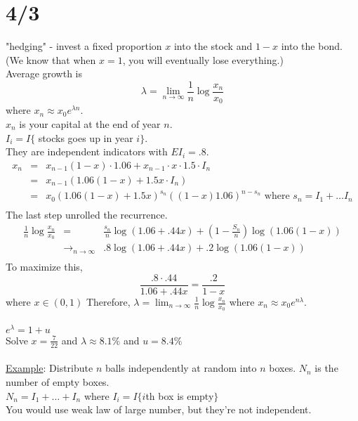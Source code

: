 \section*{4/3}
  "hedging" - invest a fixed proportion $x$ into the stock and
  $1 - x$ into the bond. (We know that when $x = 1$, you will 
  eventually lose everything.)\\
  Average growth is
  $$
    \lambda = \lim_{n \to \infty} \frac{1}{n} \log\frac{x_n}{x_0}
  $$
  where $x_n \approx x_0 e^{\lambda n}$.\\
  $x_n$ is your capital at the end of year $n$.\\
  $I_i = I\{$ stocks goes up in year $i \}$.\\
  They are independent indicators with $EI_i = .8$.\\
  \begin{eqnarray*}
    x_n & = & x_{n-1}(1-x)\cdot 1.06 + x_{n-1} \cdot x \cdot 1.5 \cdot I_n\\
      & = & x_{n-1}(1.06(1 - x) + 1.5x \cdot I_n)\\
      & = & x_0(1.06(1-x) + 1.5x)^{s_n}((1 - x)1.06)^{n - s_n} 
        \text{ where } s_n = I_1 + \ldots I_n\\
  \end{eqnarray*}
  The last step unrolled the recurrence.\\
  \begin{eqnarray*}
    \frac{1}{n}\log\frac{x_n}{x_0} & = & \frac{s_n}{n} \log(1.06 + .44x)
      + (1 - \frac{S_n}{n})\log(1.06(1-x))\\
      & \to_{n \to \infty} & .8 \log(1.06 + .44x) + .2 \log(1.06(1 - x))\\
  \end{eqnarray*}
  To maximize this,
  $$
    \frac{.8 \cdot .44}{1.06 + .44x} = \frac{.2}{1-x}
  $$
  where $x \in (0,1)$
  Therefore,
  $\lambda = \lim_{n \to \infty} \frac{1}{n}\log\frac{x_n}{x_0}$ where
  $x_n \approx x_0 e^{n\lambda}$.\\\\
  $e^{\lambda} = 1 + u$\\
  Solve $x = \frac{7}{22}$ and $\lambda \approx 8.1\%$ and $u = 8.4\%$\\\\
\underline{Example}:  Distribute $n$ balls independently at random into
  $n$ boxes. $N_n$ is the number of empty boxes.\\
  $N_n = I_1 + \ldots + I_n$ where $I_i = I\{ i$th box is empty$\}$\\
  You would use weak law of large number, but they're not independent.\\
